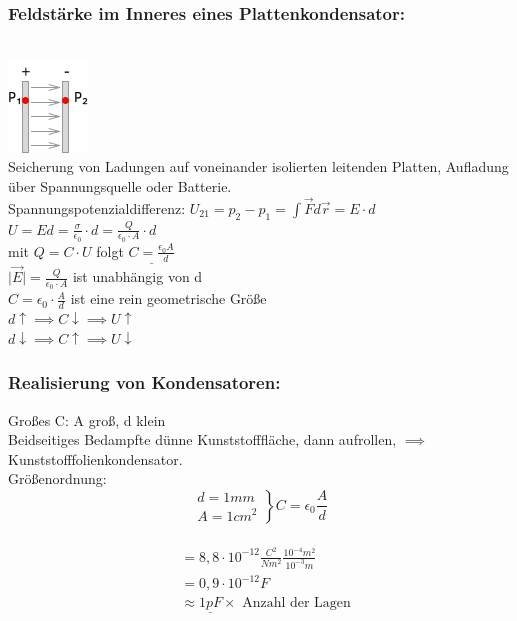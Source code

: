 \documentclass[11pt]{article}
\begin{document}
\subsubsection{Feldstärke im Inneres eines Plattenkondensator:}

\hfill\\
\includegraphics{skizzen/14/14_8B7}
\hfill\\

Seicherung von Ladungen auf voneinander isolierten leitenden Platten, Aufladung über Spannungsquelle oder Batterie.\\

Spannungspotenzialdifferenz: $ U_{21}=p_2-p_1=\int \vec{F}d\vec{r}=E\cdot d $\\
$ U = Ed=\frac{\sigma}{\epsilon_0}\cdot d = \frac{Q}{\epsilon_0\cdot A}\cdot d $\\
mit $Q=C\cdot U$ folgt $ \underline{C=\frac{\epsilon_0 A}{d}} $\\

$\boxed{\vert\vec{E}\vert=\frac{Q}{\epsilon_0\cdot A}}$ ist unabhängig von d\\

$\boxed{C=\epsilon_0\cdot \frac{A}{d}}$ ist eine rein geometrische Größe\\

$d\uparrow \implies C\downarrow \implies U\uparrow$\\

$d\downarrow \implies C\uparrow \implies U \downarrow$\\


\subsubsection{Realisierung von Kondensatoren:}

Großes C: A groß, d klein\\
Beidseitiges Bedampfte dünne Kunststofffläche, dann aufrollen, $\implies$ Kunststofffolienkondensator.\\

Größenordnung: \begin{equation} \left. \begin{aligned} d=1mm\\ A=1cm^2\end{aligned}\right\}C=\epsilon_0\frac{A}{d}\end{equation}\\
	 \begin{align*}&=8,8\cdot 10^{-12}\frac{C^2}{Nm^2}\frac{10^{-4}m^2}{10^{-3}m}\\
	 &=0,9\cdot 10^{-12}F\\
	 &\approx \underline{1pF} \times \text{ Anzahl der Lagen}
	 \end{align*}
\end{document}
